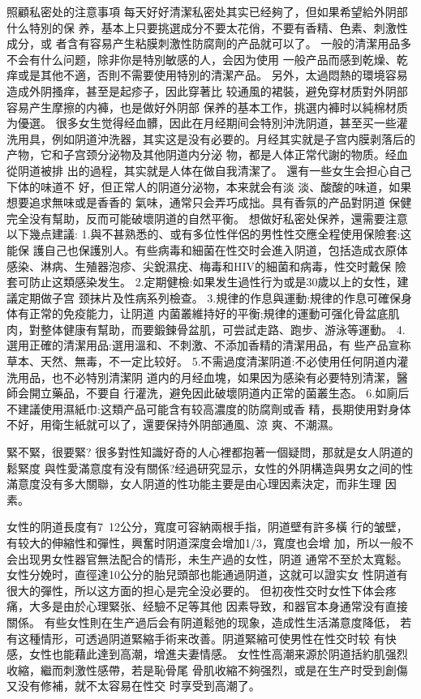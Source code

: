 \documentclass[12pt,UTF8]{ctexbook}
\begin{document}
照顧私密处的注意事項
每天好好清潔私密处其实已经夠了，但如果希望給外阴部什么特別的保
养，基本上只要挑選成分不要太花俏，不要有香精、色素、刺激性成分，或
者含有容易产生粘膜刺激性防腐劑的产品就可以了。
一般的清潔用品多不会有什么问题，除非你是特別敏感的人，会因为使用
一般产品而感到乾燥、乾痒或是其他不適，否則不需要使用特別的清潔产品。
另外，太過悶熱的環境容易造成外阴搔痒，甚至是起疹子，因此穿著比
较通風的裙裝，避免穿材质對外阴部容易产生摩擦的内褲，也是做好外阴部
保养的基本工作，挑選内褲时以純棉材质为優選。
很多女生觉得经血髒，因此在月经期间会特別沖洗阴道，甚至买一些灌
洗用具，例如阴道沖洗器，其实这是没有必要的。月经其实就是子宫内膜剥落后的产物，它和子宫颈分泌物及其他阴道内分泌
物，都是人体正常代謝的物质。经血從阴道被排
出的過程，其实就是人体在做自我清潔了。
還有一些女生会担心自己下体的味道不
好，但正常人的阴道分泌物，本来就会有淡
淡、酸酸的味道，如果想要追求無味或是香香的
氣味，通常只会弄巧成拙。具有香氛的产品對阴道
保健完全没有幫助，反而可能破壞阴道的自然平衡。
想做好私密处保养，還需要注意以下幾点建議:
1.與不甚熟悉的、或有多位性伴侶的男性性交應全程使用保險套:这能保
護自己也保護別人。有些病毒和細菌在性交时会進入阴道，包括造成衣原体
感染、淋病、生殖器泡疹、尖銳濕疣、梅毒和HIV的細菌和病毒，性交时戴保
險套可防止这類感染发生。
2.定期健檢:如果发生過性行为或是30歲以上的女性，建議定期做子宫
颈抹片及性病系列檢查。
3.規律的作息與運動:規律的作息可確保身体有正常的免疫能力，让阴道
内菌叢維持好的平衡;規律的運動可强化骨盆底肌肉，對整体健康有幫助，而要鍛鍊骨盆肌，可尝試走路、跑步、游泳等運動。
4.選用正確的清潔用品:選用溫和、不刺激、不添加香精的清潔用品，有
些产品宣称草本、天然、無毒，不一定比较好。
5.不需過度清潔阴道:不必使用任何阴道内灌洗用品，也不必特別清潔阴
道内的月经血塊，如果因为感染有必要特別清潔，醫師会開立藥品，不要自
行灌洗，避免因此破壞阴道内正常的菌叢生态。
6.如廁后不建議使用濕紙巾:这類产品可能含有较高濃度的防腐劑或香
精，長期使用對身体不好，用衛生紙就可以了，還要保持外阴部通風、涼
爽、不潮濕。

緊不緊，很要緊?
很多對性知識好奇的人心裡都抱著一個疑問，那就是女人阴道的鬆緊度
與性愛滿意度有没有關係?经過研究显示，女性的外阴構造與男女之间的性
滿意度没有多大關聯，女人阴道的性功能主要是由心理因素決定，而非生理
因素。

女性的阴道長度有7~12公分，寬度可容納兩根手指，阴道壁有許多橫
行的皱壁，有较大的伸縮性和彈性，興奮时阴道深度会增加1/3，寬度也会增
加，所以一般不会出现男女性器官無法配合的情形，未生产過的女性，阴道
通常不至於太寬鬆。
女性分娩时，直徑達10公分的胎兒頭部也能通過阴道，这就可以證实女
性阴道有很大的彈性，所以这方面的担心是完全没必要的。
但初夜性交时女性下体会疼痛，大多是由於心理緊张、经驗不足等其他
因素导致，和器官本身通常没有直接關係。
有些女性則在生产過后会有阴道鬆弛的现象，造成性生活滿意度降低，
若有这種情形，可透過阴道緊縮手術来改善。阴道緊縮可使男性在性交时较
有快感，女性也能藉此達到高潮，增進夫妻情感。
女性性高潮来源於阴道括約肌强烈收縮，繼而刺激性感帶，若是恥骨尾
骨肌收縮不夠强烈，或是在生产时受到創傷又没有修補，就不太容易在性交
时享受到高潮了。
\end{document}
